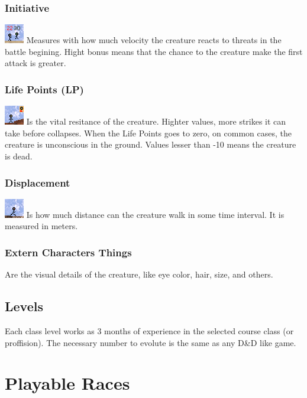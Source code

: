 \documentclass[ letterpaper,12pt]{article}
\begin{document}
\subsubsection{Initiative}
\includegraphics{../data/skills/Img/iniciativa.png}
Measures with how much velocity the creature reacts to threats in the battle begining. Hight bonus means that the chance to the creature make the first attack is greater.

\subsubsection{Life Points (LP)}
\includegraphics{../data/skills/Img/pv.png}
Is the vital resitance of the creature. Highter values, more strikes it can take before collapses. When the Life Points goes to zero, on common cases, the creature is unconscious in the ground. Values lesser than -10 means the creature is dead.

\subsubsection{Displacement}
\includegraphics{../data/skills/Img/deslocamento.png}
Is how much distance can the creature walk in some time interval. It is measured in meters.

\subsubsection{Extern Characters Things}
Are the visual details of the creature, like eye color, hair, size, and others.

\subsection{Levels}
Each class level works as 3 months of experience in the selected course class (or proffision). The necessary number to evolute is the same as any D\&D like game.

\section{Playable Races}
\end{document}
